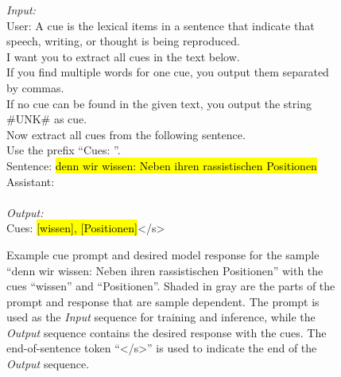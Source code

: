 \documentclass[11pt,a4paper]{article}
\newcommand{\sample}[1]{\sethlcolor{sample}\hl{#1}}
\begin{document}
\begin{figure*}[t]
    \centering
    \begin{mdframed}
        \small
        \emph{Input:}\\
        User: A cue is the lexical items in a sentence that indicate that speech, writing, or thought is being reproduced.\\
        I want you to extract all cues in the text below.\\
        If you find multiple words for one cue, you output them separated by commas.\\
        If no cue can be found in the given text, you output the string \#UNK\# as cue.\\
        Now extract all cues from the following sentence.\\
        Use the prefix ``Cues: ''.\\
        Sentence: \sample{denn wir wissen: Neben ihren rassistischen Positionen}\\
        Assistant:\\
        \\
        \emph{Output:}\\
        Cues: \sample{[wissen], [Positionen]}\textless/s\textgreater
    \end{mdframed}
    \caption{
        Example cue prompt and desired model response for the sample ``denn wir wissen: Neben ihren rassistischen Positionen'' with the cues ``wissen'' and ``Positionen''.
        Shaded in gray are the parts of the prompt and response that are sample dependent.
        The prompt is used as the \emph{Input} sequence for training and inference, while the \emph{Output} sequence contains the desired response with the cues.
        The end-of-sentence token ``\textless/s\textgreater'' is used to indicate the end of the \emph{Output} sequence.
    }
    \label{fig:cue_prompt}
\end{figure*}
\end{document}
